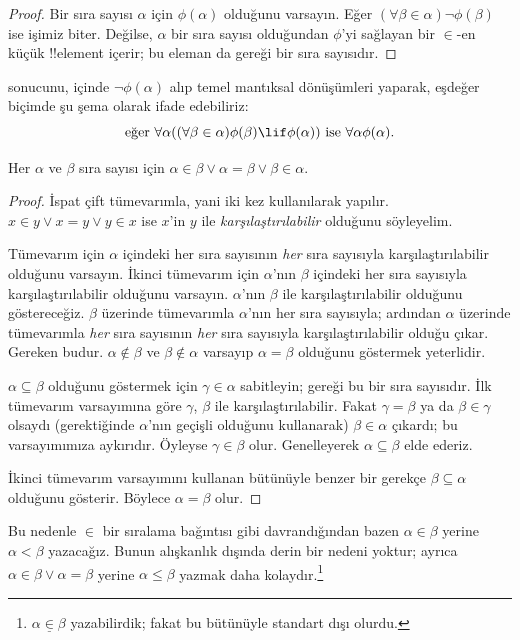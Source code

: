 \documentclass[../../../include/open-logic-section]{subfiles}
\begin{document}
\begin{proof}
Bir sıra sayısı $\alpha$ için $\phi(\alpha)$ olduğunu varsayın. Eğer
$(\forall\beta\in\alpha)\lnot\phi(\beta)$ ise işimiz biter. Değilse,
$\alpha$ bir sıra sayısı olduğundan $\phi$'yi sağlayan bir $\in$-en küçük
!!{element} içerir; bu eleman da  gereği bir sıra
sayısıdır.
\end{proof}
\noindent
{} sonucunu,  içinde
$\lnot\phi(\alpha)$ alıp temel mantıksal dönüşümleri yaparak, eşdeğer biçimde
şu şema olarak ifade edebiliriz:
\[
\text{eğer }\forall \alpha((\forall \beta \in \alpha)\phi(\beta) \lif
\phi(\alpha))\text{ ise }\forall \alpha\phi(\alpha).
\]

\begin{thm}
Her $\alpha$ ve $\beta$ sıra sayısı için
$\alpha\in\beta\lor\alpha=\beta\lor\beta\in\alpha$.
\end{thm}

\begin{proof}
İspat çift tümevarımla, yani  iki kez kullanılarak
yapılır. $x\in y\lor x=y\lor y\in x$ ise $x$'in $y$ ile
\emph{karşılaştırılabilir} olduğunu söyleyelim.

Tümevarım için $\alpha$ içindeki her sıra sayısının \emph{her} sıra
sayısıyla karşılaştırılabilir olduğunu varsayın. İkinci tümevarım için
$\alpha$'nın $\beta$ içindeki her sıra sayısıyla karşılaştırılabilir
olduğunu varsayın. $\alpha$'nın $\beta$ ile karşılaştırılabilir olduğunu
göstereceğiz. $\beta$ üzerinde tümevarımla $\alpha$'nın her sıra sayısıyla;
ardından $\alpha$ üzerinde tümevarımla \emph{her} sıra sayısının \emph{her}
sıra sayısıyla karşılaştırılabilir olduğu çıkar. Gereken budur.
$\alpha\notin\beta$ ve $\beta\notin\alpha$ varsayıp $\alpha=\beta$
olduğunu göstermek yeterlidir.

$\alpha\subseteq\beta$ olduğunu göstermek için $\gamma\in\alpha$
sabitleyin;  gereği bu bir sıra sayısıdır. İlk tümevarım
varsayımına göre $\gamma$, $\beta$ ile karşılaştırılabilir. Fakat
$\gamma=\beta$ ya da $\beta\in\gamma$ olsaydı (gerektiğinde $\alpha$'nın
geçişli olduğunu kullanarak) $\beta\in\alpha$ çıkardı; bu varsayımımıza
aykırıdır. Öyleyse $\gamma\in\beta$ olur. Genelleyerek
$\alpha\subseteq\beta$ elde ederiz.

İkinci tümevarım varsayımını kullanan bütünüyle benzer bir gerekçe
$\beta\subseteq\alpha$ olduğunu gösterir. Böylece $\alpha=\beta$ olur.
\end{proof}\noindent
Bu nedenle $\in$ bir sıralama bağıntısı gibi davrandığından bazen
$\alpha\in\beta$ yerine $\alpha<\beta$ yazacağız. Bunun alışkanlık dışında
derin bir nedeni yoktur; ayrıca $\alpha\in\beta\lor\alpha=\beta$ yerine
$\alpha\leq\beta$ yazmak daha kolaydır.\footnote{$\alpha
\mathrel{\underline{\in}}\beta$ yazabilirdik; fakat bu bütünüyle standart
dışı olurdu.}
\end{document}
